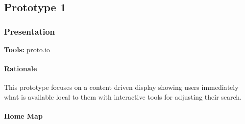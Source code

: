 \subsection{Prototype 1}

\subsubsection{Presentation}
\textbf{Tools:} proto.io

\paragraph{Rationale}
This prototype focuses on a content driven display showing users immediately
what is available local to them with interactive tools for adjusting their
search.

\paragraph{Home Map}

